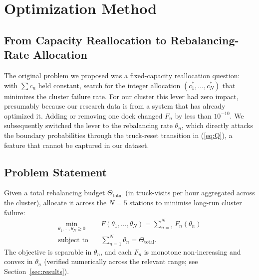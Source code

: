 \documentclass[conference]{IEEEtran}
\begin{document}
\section{Optimization Method}\label{sec:opt}
\subsection{From Capacity Reallocation to Rebalancing-Rate Allocation}

The original problem we proposed was a fixed-capacity reallocation question: with $\sum c_n$ held constant, search for the integer allocation $(c_1^*, \ldots, c_N^*)$ that minimizes the cluster failure rate. For our cluster this lever had zero impact, presumably because our research data is from a system that has already optimized it. Adding or removing one dock changed $F_n$ by less than $10^{-10}$. We subsequently switched the lever to the rebalancing rate $\theta_n$, which directly attacks the boundary probabilities through the truck-reset transition in (\ref{eq:Q}), a feature that cannot be captured in our dataset.
 
\subsection{Problem Statement}

Given a total rebalancing budget $\Theta_{\text{total}}$ (in truck-visits per hour aggregated across the cluster), allocate it across the $N = 5$ stations to minimise long-run cluster failure:
\begin{equation}\label{eq:opt}
\begin{aligned}
\min_{\theta_1, \ldots, \theta_N \ge 0} \quad & F(\theta_1, \ldots, \theta_N) = \sum_{n=1}^{N} F_n(\theta_n) \\
\text{subject to} \quad & \sum_{n=1}^{N} \theta_n = \Theta_{\text{total}}.
\end{aligned}
\end{equation}
The objective is separable in $\theta_n$, and each $F_n$ is monotone non-increasing and convex in $\theta_n$ (verified numerically across the relevant range; see Section~\ref{sec:results}).
\end{document}
